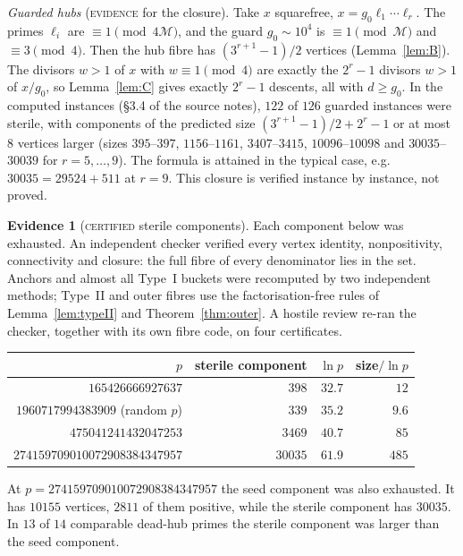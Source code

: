 \documentclass[11pt,reqno]{amsart}
\theoremstyle{definition}
\newtheorem{evidence}[theorem]{Evidence}
\newcommand{\status}[1]{\textsc{#1}}
\begin{document}
\emph{Guarded hubs} (\status{evidence} for the closure).  Take $x$
squarefree, $x=g_0\ell_1\cdots\ell_r$.  The primes $\ell_i$ are
$\equiv1\pmod{4\mathcal M}$, and the guard $g_0\sim10^4$ is
$\equiv1\pmod{\mathcal M}$ and $\equiv3\pmod4$.  Then the hub fibre has
$(3^{r+1}-1)/2$ vertices (Lemma~\ref{lem:B}).  The divisors $w>1$ of $x$
with $w\equiv1\pmod4$ are exactly the $2^r-1$ divisors $w>1$ of $x/g_0$,
so Lemma~\ref{lem:C} gives exactly $2^r-1$ descents, all with
$d\ge g_0$.  In the computed instances (\S3.4 of the source notes), $122$ of $126$
guarded instances were sterile, with components of the predicted size
$(3^{r+1}-1)/2+2^r-1$ or at most $8$ vertices larger (sizes $395$--$397$,
$1156$--$1161$, $3407$--$3415$, $10096$--$10098$ and $30035$--$30039$ for
$r=5,\dots,9$).  The formula is attained in the typical case, e.g.\
$30035=29524+511$ at $r=9$.  This closure is verified instance by instance,
not proved.

\begin{evidence}[\status{certified} sterile components]\label{ev:sterile}
Each component below was exhausted.  An independent checker verified every
vertex identity, nonpositivity, connectivity and closure: the full fibre of
every denominator lies in the set.  Anchors and almost all Type~I buckets
were recomputed by two independent methods; Type~II and outer fibres use
the factorisation-free rules of Lemma~\ref{lem:typeII} and
Theorem~\ref{thm:outer}.  A hostile review re-ran the checker, together
with its own fibre code, on four certificates.
\begin{center}
\begin{tabular}{rrrr}
\toprule
$p$ & sterile component & $\ln p$ & size$/\ln p$\\\midrule
$165426666927637$ & $398$ & $32.7$ & $12$\\
$1960717994383909$ (random $p$) & $339$ & $35.2$ & $9.6$\\
$475041241432047253$ & $3469$ & $40.7$ & $85$\\
$274159709010072908384347957$ & $30035$ & $61.9$ & $485$\\\bottomrule
\end{tabular}
\end{center}
At $p=274159709010072908384347957$ the seed component was also exhausted.
It has $10155$ vertices, $2811$ of them positive, while the sterile
component has $30035$.  In $13$ of $14$ comparable dead-hub primes the
sterile component was larger than the seed component.
\end{evidence}
\end{document}
